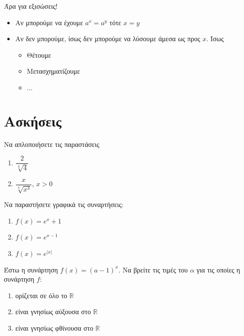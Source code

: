 \documentclass{presentation}
\begin{document}
\begin{frame}{Άρα για εξισώσεις!}
  \begin{itemize}
    \item<1-> Αν μπορούμε να έχουμε $a^x=a^y$ τότε $x=y$
    \item<2-> Αν δεν μπορούμε, ίσως δεν μπορούμε να λύσουμε άμεσα ως προς $x$. Ίσως
          \begin{itemize}
            \item<3-> Θέτουμε
            \item<4-> Μετασχηματίζουμε
            \item<4-> ...
          \end{itemize}
  \end{itemize}
\end{frame}

\section{Ασκήσεις}
\begin{askisi}
  Να απλοποιήσετε τις παραστάσεις
  \begin{enumerate}
    \item<1-> $\dfrac{2}{\sqrt[3]{4}}$
    \item<2-> $\dfrac{x}{\sqrt[4]{x^3}}$, $x>0$
  \end{enumerate}


\end{askisi}

\begin{askisi}
  Να παραστήσετε γραφικά τις συναρτήσεις:
  \begin{enumerate}
    \item<1-> $f(x)=e^x+1$
    \item<2-> $f(x)=e^{x-1}$
    \item<3-> $f(x)=e^{|x|}$
  \end{enumerate}


\end{askisi}

\begin{askisi}
  Έστω η συνάρτηση $f(x)=(a-1)^x$. Να βρείτε τις τιμές του $α$ για τις οποίες η συνάρτηση $f$:
  \begin{enumerate}
    \item<1-> ορίζεται σε όλο το $\mathbb{R}$
    \item<2-> είναι γνησίως αύξουσα στο $\mathbb{R}$
    \item<3-> είναι γνησίως φθίνουσα στο $\mathbb{R}$
  \end{enumerate}


\end{askisi}
\end{document}
